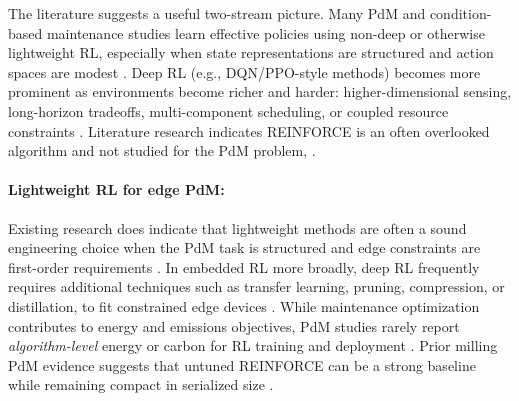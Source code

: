 \documentclass[sn-basic]{sn-jnl} %
\begin{document}
The literature suggests a useful two-stream picture. Many PdM and condition-based maintenance studies learn effective policies using non-deep or otherwise lightweight RL, especially when state representations are structured and action spaces are modest \cite{Adsule2020, Yousefi2020, Rasay2024, Dadash2024}. Deep RL (e.g., DQN/PPO-style methods) becomes more prominent as environments become richer and harder: higher-dimensional sensing, long-horizon tradeoffs, multi-component scheduling, or coupled resource constraints \cite{Liu2020, Chen2023, Lee2022, Ong2022-02}. Literature research indicates REINFORCE is an often overlooked algorithm and not studied for the PdM problem, \cite{Siraskar2025}. 

\paragraph{Lightweight RL for edge PdM:}
Existing research does indicate that lightweight methods are often a sound engineering choice when the PdM task is structured and edge constraints are first-order requirements \cite{Compare2020, Njor2024, Pandey2023}. In embedded RL more broadly, deep RL frequently requires additional techniques such as transfer learning, pruning, compression, or distillation, to fit constrained edge devices \cite{Jang2020, Szydlo2022, Xu2022}.
While maintenance optimization contributes to energy and emissions objectives, PdM studies rarely report \emph{algorithm-level} energy or carbon for RL training and deployment \cite{Banyai2021, Banyai2022, JasiulewiczKaczmarek2024}. Prior milling PdM evidence suggests that untuned \textsc{REINFORCE} can be a strong baseline while remaining compact in serialized size \cite{Siraskar2025}.


\end{document}
